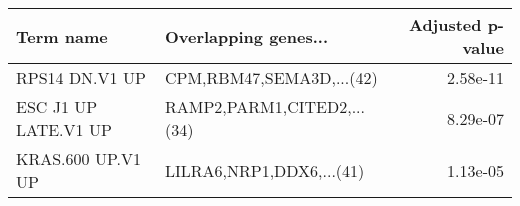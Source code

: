 \begin{tabular}{llr}
\toprule
           Term name &       Overlapping genes... &  Adjusted p-value \\
\midrule
      RPS14 DN.V1 UP &   CPM,RBM47,SEMA3D,...(42) &          2.58e-11 \\
ESC J1 UP LATE.V1 UP & RAMP2,PARM1,CITED2,...(34) &          8.29e-07 \\
   KRAS.600 UP.V1 UP &   LILRA6,NRP1,DDX6,...(41) &          1.13e-05 \\
\bottomrule
\end{tabular}
